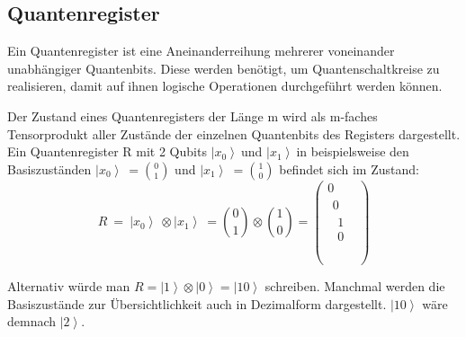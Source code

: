 \subsection{Quantenregister}

Ein Quantenregister ist eine Aneinanderreihung mehrerer voneinander unabhängiger Quantenbits. Diese werden benötigt, um Quantenschaltkreise zu realisieren, damit auf ihnen logische Operationen durchgeführt werden können. 

Der Zustand eines Quantenregisters der Länge m wird als m-faches Tensorprodukt aller Zustände der einzelnen Quantenbits des Registers dargestellt. Ein Quantenregister R mit 2 Qubits $\left|\left.x_0\right\rangle\ \right.$und $\left|\left.x_1\right\rangle\ \right.$in beispielsweise den Basiszuständen $\left|\left.x_0\right\rangle\ \right.=\binom{0}{1}$ und $\left|\left.x_1\right\rangle\ \right.=\binom{1}{0}$ befindet sich im Zustand:
$$R\ =\ \left|\left.x_0\right\rangle\ \right.\otimes\left|\left.x_1\right\rangle\ \right.=\binom{0}{1}\otimes\binom{1}{0}=\left(\begin{matrix}0\\\begin{matrix}0\\\begin{matrix}1\\0\\\end{matrix}\\\end{matrix}\\\end{matrix}\right)$$

Alternativ würde man $R=\left|1\right\rangle\otimes\left|0\right\rangle=\left|10\right\rangle$ schreiben. Manchmal werden die Basiszustände zur Übersichtlichkeit auch in Dezimalform dargestellt. $\left|10\right\rangle$ wäre demnach $\left|2\right\rangle$. 

